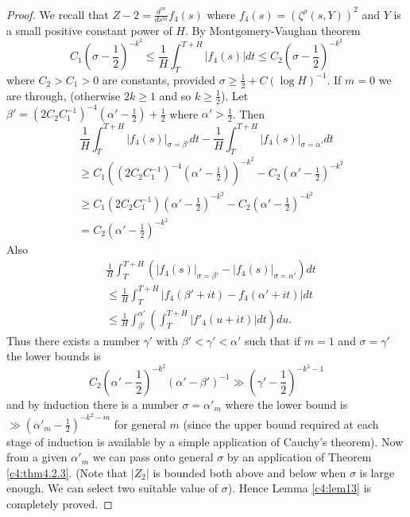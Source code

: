 \begin{proof}
We recall that $Z-2 = \frac{d^m}{ds^m} f_4(s)$ where $f_4 (s) = (\zeta^\rho (s,Y))^2$ and $Y$ is a small positive constant power of $H$. By Montgomery-Vaughan theorem
$$
C_1 \left(\sigma -\frac{1}{2} \right)^{-k^2} \leq \frac{1}{H} \int^{T+H}_T |f_4 (s)| dt \leq C_2 \left(\sigma -\frac{1}{2} \right)^{-k^2}
$$
where $C_2 > C_1 > 0$ are constants, provided $\sigma\geq \frac{1}{2} + C (\log H)^{-1}$. If $m=0$ we are through, (otherwise $2k \geq 1$ and so $k \geq \frac{1}{2}$). Let $\beta' = (2C_2 C^{-1}_1)^{-4} (\alpha' -\frac{1}{2}) + \frac{1}{2}$ where $\alpha' > \frac{1}{2}$. Then
$$
\frac{1}{H} \int^{T+H}_T |f_4 (s)|_{\sigma = \beta'} dt - \frac{1}{H} \int^{T+H}_T |f_4 (s)|_{\sigma = \alpha'} dt
$$
\begin{align*}
& \geq C_1 \left( \left(2C_2 C^{-1}_1 \right)^{-4} \left(\alpha' -\frac{1}{2} \right) \right)^{-k^2} - C_2 \left(\alpha' -\frac{1}{2} \right)^{-k^2}\\
& \geq C_1(2 C_2 C^{-1}_1) \left(\alpha' -\frac{1}{2} \right)^{-k^2} -C_2 \left(\alpha' -\frac{1}{2} \right)^{-k^2}\\
& = C_2 \left(\alpha' - \frac{1}{2} \right)^{-k^2}
\end{align*}\pageoriginale
Also
\begin{align*}
& \frac{1}{H} \int^{T+H}_T (|f_4 (s)|_{\sigma = \beta'} - |f_4 (s)|_{\sigma = \alpha'}) dt\\
& \leq \frac{1}{H} \int^{T+H}_T |f_4 (\beta' + it) - f_4 (\alpha' + it)| dt\\
& \leq \frac{1}{H} \int^{\alpha'}_{\beta'} \left(\int^{T+H}_T |f'_4 (u+it) |dt \right) du. 
\end{align*}
Thus there exists a number $\gamma'$ with $\beta' < \gamma' < \alpha'$ such that if $m=1$ and $\sigma = \gamma'$ the lower bounds is
$$
C_2 \left(\alpha' -\frac{1}{2} \right)^{-k^2} (\alpha' -\beta')^{-1} \gg \left(\gamma' -\frac{1}{2} \right)^{-k^2 -1}
$$
and by induction there is a number $\sigma = \alpha'_m$ where the lower bound is $\gg \left(\alpha'_m-\frac{1}{2} \right)^{-k^2 -m}$ for general $m$ (since the upper bound required at each stage of induction is available by a simple application of Cauchy's theorem). Now from a given $\alpha'_m$ we can pass onto general $\sigma$ by an application of Theorem \ref{c4:thm4.2.3}. (Note that $|Z_2|$ is bounded both above and below when $\sigma$ is large enough. We can select two suitable value of $\sigma$). Hence Lemma \ref{c4:lem13} is completely proved.
\end{proof}

